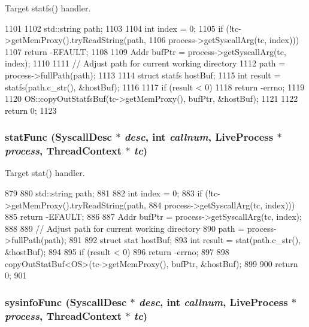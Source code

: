 Target statfs() handler. 


\begin{DoxyCode}
1101 {
1102     std::string path;
1103 
1104     int index = 0;
1105     if (!tc->getMemProxy().tryReadString(path,
1106                 process->getSyscallArg(tc, index))) {
1107         return -EFAULT;
1108     }
1109     Addr bufPtr = process->getSyscallArg(tc, index);
1110 
1111     // Adjust path for current working directory
1112     path = process->fullPath(path);
1113 
1114     struct statfs hostBuf;
1115     int result = statfs(path.c_str(), &hostBuf);
1116 
1117     if (result < 0)
1118         return -errno;
1119 
1120     OS::copyOutStatfsBuf(tc->getMemProxy(), bufPtr, &hostBuf);
1121 
1122     return 0;
1123 }
\end{DoxyCode}
\hypertarget{syscall__emul_8hh_a90a4079ec4c293ae75368d283892a19a}{
\subsubsection[{statFunc}]{ statFunc ({\bf SyscallDesc} $\ast$ {\em desc}, \/  int {\em callnum}, \/  {\bf LiveProcess} $\ast$ {\em process}, \/  {\bf ThreadContext} $\ast$ {\em tc})}}
\label{syscall__emul_8hh_a90a4079ec4c293ae75368d283892a19a}


Target stat() handler. 


\begin{DoxyCode}
879 {
880     std::string path;
881 
882     int index = 0;
883     if (!tc->getMemProxy().tryReadString(path,
884                 process->getSyscallArg(tc, index))) {
885         return -EFAULT;
886     }
887     Addr bufPtr = process->getSyscallArg(tc, index);
888 
889     // Adjust path for current working directory
890     path = process->fullPath(path);
891 
892     struct stat hostBuf;
893     int result = stat(path.c_str(), &hostBuf);
894 
895     if (result < 0)
896         return -errno;
897 
898     copyOutStatBuf<OS>(tc->getMemProxy(), bufPtr, &hostBuf);
899 
900     return 0;
901 }
\end{DoxyCode}
\hypertarget{syscall__emul_8hh_a6a54d59c2aacf12179e4ab68440f29b4}{
\subsubsection[{sysinfoFunc}]{ sysinfoFunc ({\bf SyscallDesc} $\ast$ {\em desc}, \/  int {\em callnum}, \/  {\bf LiveProcess} $\ast$ {\em process}, \/  {\bf ThreadContext} $\ast$ {\em tc})}}
\label{syscall__emul_8hh_a6a54d59c2aacf12179e4ab68440f29b4}


